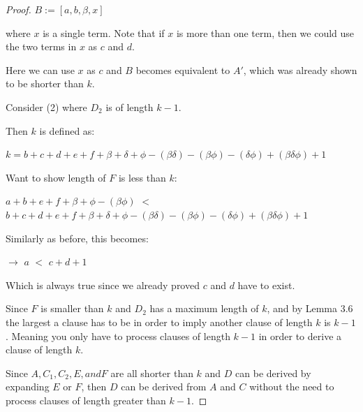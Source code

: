 \documentclass[manuscript]{acmart}
\begin{document}
\begin{proof}
        $B := [a, b, \beta, x]$

        where $x$ is a single term. Note that if $x$ is more than one term,
        then we could use the two terms in $x$ as $c$ and $d$.

        Here we can use $x$ as $c$ and $B$ becomes equivalent to $A'$, 
        which was already shown to be shorter than $k$.

        Consider (2) where $D_2$ is of length $k - 1$.

        Then $k$ is defined as:

        $k = b + c + d + e + f + \beta + \delta + \phi - (\beta \delta) 
        - (\beta \phi) - (\delta \phi) + (\beta \delta \phi) + 1$

        Want to show length of $F$ is less than $k$:

        $a + b + e + f + \beta + \phi - (\beta \phi)$ $<$ 
        $b + c + d + e + f + \beta + \delta + \phi - (\beta \delta) 
        - (\beta \phi) - (\delta \phi) + (\beta \delta \phi) + 1$

        Similarly as before, this becomes:

        $\rightarrow$ $a$ $<$ $c + d + 1$

        Which is always true since we already proved $c$ and $d$ have to exist.

        Since $F$ is smaller than $k$ and $D_2$ has a maximum length of $k$, 
        and by Lemma 3.6 the largest a clause has to be in order to imply
        another clause of length $k$ is $k-1$. Meaning you only have to process
        clauses of length $k-1$ in order to derive a clause of length $k$.
        
        Since $A, C_1, C_2, E, and F$ are all shorter than $k$ and $D$ can
        be derived by expanding $E$ or $F$, then $D$ can be derived from $A$
        and $C$ without the need to process clauses of length greater than $k - 1$.
    \end{proof}

        

\end{document}
